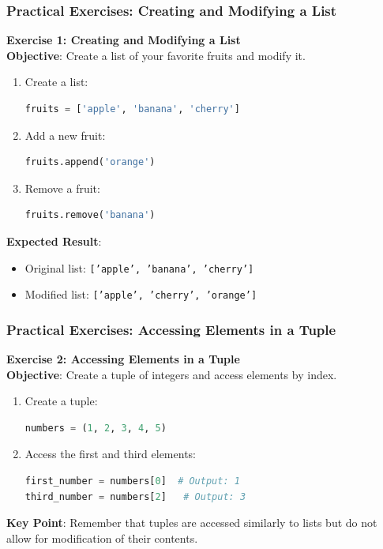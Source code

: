 \documentclass{beamer}
\begin{document}
\begin{frame}[fragile]
    \frametitle{Practical Exercises: Creating and Modifying a List}
    \textbf{Exercise 1: Creating and Modifying a List}\\
    \textbf{Objective}: Create a list of your favorite fruits and modify it.
    
    \begin{enumerate}
        \item Create a list: 
        \begin{lstlisting}[language=Python]
fruits = ['apple', 'banana', 'cherry']
        \end{lstlisting}
        \item Add a new fruit:
        \begin{lstlisting}[language=Python]
fruits.append('orange')
        \end{lstlisting}
        \item Remove a fruit:
        \begin{lstlisting}[language=Python]
fruits.remove('banana')
        \end{lstlisting}
    \end{enumerate}
    
    \textbf{Expected Result}:
    \begin{itemize}
        \item Original list: \texttt{['apple', 'banana', 'cherry']}
        \item Modified list: \texttt{['apple', 'cherry', 'orange']}
    \end{itemize}
\end{frame}

\begin{frame}[fragile]
    \frametitle{Practical Exercises: Accessing Elements in a Tuple}
    \textbf{Exercise 2: Accessing Elements in a Tuple}\\
    \textbf{Objective}: Create a tuple of integers and access elements by index.
    
    \begin{enumerate}
        \item Create a tuple:
        \begin{lstlisting}[language=Python]
numbers = (1, 2, 3, 4, 5)
        \end{lstlisting}
        \item Access the first and third elements:
        \begin{lstlisting}[language=Python]
first_number = numbers[0]  # Output: 1
third_number = numbers[2]   # Output: 3
        \end{lstlisting}
    \end{enumerate}
    
    \textbf{Key Point}: Remember that tuples are accessed similarly to lists but do not allow for modification of their contents.
\end{frame}
\end{document}

